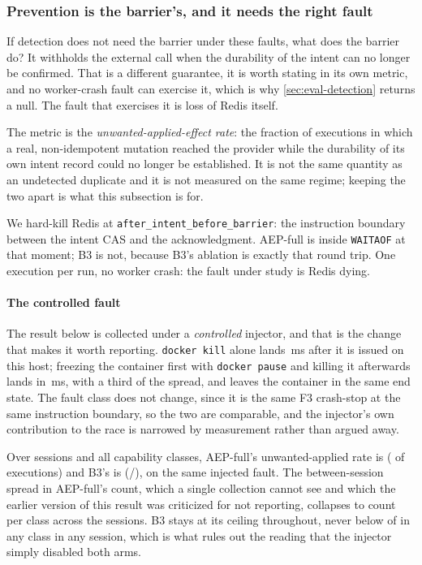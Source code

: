\subsubsection{Prevention is the barrier's, and it needs the right fault}
\label{sec:eval-prevention}

If detection does not need the barrier under these faults, what does the
barrier do? It withholds
the external call when the durability of the intent can no longer be confirmed.
That is a different guarantee, it is worth stating in its own metric, and no
worker-crash fault can exercise it, which is why \cref{sec:eval-detection}
returns a null. The fault that exercises it is loss of Redis itself.

The metric is the \emph{unwanted-applied-effect rate}: the fraction of
executions in which a real, non-idempotent mutation reached the provider while
the durability of its own intent record could no longer be established. It is
not the same quantity as an undetected duplicate and it is not measured on the
same regime; keeping the two apart is what this subsection is for.

We hard-kill Redis at \texttt{after\_intent\_before\_barrier}: the instruction
boundary between the intent CAS and the acknowledgment. AEP-full is inside
\texttt{WAITAOF} at that moment; B3 is not, because B3's ablation is exactly
that round trip. One execution per run, no worker crash: the fault under
study is Redis dying.

\paragraph{The controlled fault} The result below is collected under a
\emph{controlled} injector, and that is the change that makes it worth
reporting. \texttt{docker kill} alone lands \UncontrolledLanding{}\,ms after it
is issued on this host; freezing the container first with \texttt{docker pause}
and killing it afterwards lands in \ControlledLanding{}\,ms, with a third of the
spread, and leaves the container in the same end state. The fault class does not
change, since it is the same F3 crash-stop at the same instruction boundary,
so the two are comparable, and the injector's own contribution to the race is
narrowed by measurement rather than argued away.

Over \ArmASessions{} sessions and all \ArmAClasses{} capability classes,
AEP-full's unwanted-applied rate is \ArmAAepRate{} (\ArmAAepApplied{} of
\ArmAAepN{} executions) and B3's is \ArmABthreeRate{}
(\ArmABthreeApplied{}/\ArmABthreeN{}), on the same injected fault. The
between-session spread in AEP-full's count, which a single collection cannot
see and which the earlier version of this result was criticized for not
reporting, collapses to \ArmASpreadMax{} count per class across the
\ArmASessions{} sessions. B3 stays at its ceiling throughout, never below
\ArmABthreeFloor{} of \AepKillRuns{} in any class in any session, which is what
rules out the reading that the injector simply disabled both arms.

